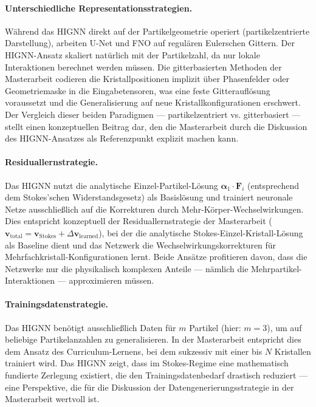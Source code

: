 \documentclass[a4paper,12pt]{article}
\begin{document}
\paragraph{Unterschiedliche Representationsstrategien.}
Während das HIGNN direkt auf der Partikelgeometrie operiert (partikelzentrierte Darstellung), arbeiten U-Net und FNO auf regulären Eulerschen Gittern. Der HIGNN-Ansatz skaliert natürlich mit der Partikelzahl, da nur lokale Interaktionen berechnet werden müssen. Die gitterbasierten Methoden der Masterarbeit codieren die Kristallpositionen implizit über Phasenfelder oder Geometriemaske in die Eingabetensoren, was eine feste Gitterauflösung voraussetzt und die Generalisierung auf neue Kristallkonfigurationen erschwert. Der Vergleich dieser beiden Paradigmen — partikelzentriert vs. gitterbasiert — stellt einen konzeptuellen Beitrag dar, den die Masterarbeit durch die Diskussion des HIGNN-Ansatzes als Referenzpunkt explizit machen kann.

\paragraph{Residuallernstrategie.}
Das HIGNN nutzt die analytische Einzel-Partikel-Lösung $\boldsymbol{\alpha}_1 \cdot \mathbf{F}_i$ (entsprechend dem Stokes'schen Widerstandsgesetz) als Basislösung und trainiert neuronale Netze ausschließlich auf die Korrekturen durch Mehr-Körper-Wechselwirkungen. Dies entspricht konzeptuell der Residuallernstrategie der Masterarbeit ($\mathbf{v}_{\mathrm{total}} = \mathbf{v}_{\mathrm{Stokes}} + \Delta\mathbf{v}_{\mathrm{learned}}$), bei der die analytische Stokes-Einzel-Kristall-Lösung als Baseline dient und das Netzwerk die Wechselwirkungskorrekturen für Mehrfachkristall-Konfigurationen lernt. Beide Ansätze profitieren davon, dass die Netzwerke nur die physikalisch komplexen Anteile — nämlich die Mehrpartikel-Interaktionen — approximieren müssen.

\paragraph{Trainingsdatenstrategie.}
Das HIGNN benötigt ausschließlich Daten für $m$ Partikel (hier: $m = 3$), um auf beliebige Partikelanzahlen zu generalisieren. In der Masterarbeit entspricht dies dem Ansatz des Curriculum-Lernens, bei dem sukzessiv mit einer bis $N$ Kristallen trainiert wird. Das HIGNN zeigt, dass im Stokes-Regime eine mathematisch fundierte Zerlegung existiert, die den Trainingsdatenbedarf drastisch reduziert — eine Perspektive, die für die Diskussion der Datengenerierungsstrategie in der Masterarbeit wertvoll ist.
\end{document}
